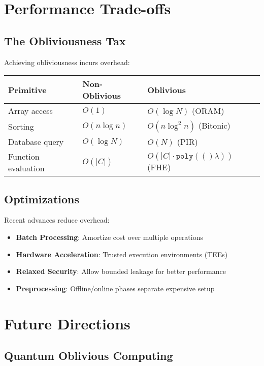 \documentclass[11pt,final,hidelinks]{article}
\newcommand{\poly}[1]{\mathtt{poly}(#1)}
\begin{document}
\section{Performance Trade-offs}

\subsection{The Obliviousness Tax}

Achieving obliviousness incurs overhead:

\begin{center}
\begin{tabular}{lll}
\textbf{Primitive} & \textbf{Non-Oblivious} & \textbf{Oblivious} \\
\hline
Array access & $O(1)$ & $O(\log N)$ (ORAM) \\
Sorting & $O(n \log n)$ & $O(n \log^2 n)$ (Bitonic) \\
Database query & $O(\log N)$ & $O(N)$ (PIR) \\
Function evaluation & $O(|C|)$ & $O(|C| \cdot \poly(\lambda))$ (FHE) \\
\end{tabular}
\end{center}

\subsection{Optimizations}

Recent advances reduce overhead:
\begin{itemize}
    \item \textbf{Batch Processing}: Amortize cost over multiple operations
    \item \textbf{Hardware Acceleration}: Trusted execution environments (TEEs)
    \item \textbf{Relaxed Security}: Allow bounded leakage for better performance
    \item \textbf{Preprocessing}: Offline/online phases separate expensive setup
\end{itemize}

\section{Future Directions}

\subsection{Quantum Oblivious Computing}
\end{document}
